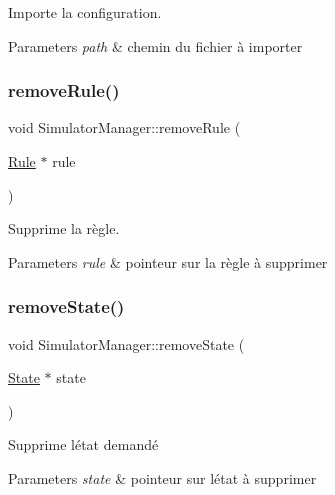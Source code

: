 Importe la configuration. 


\begin{DoxyParams}{Parameters}
{\em path} & chemin du fichier à importer \\
\hline
\end{DoxyParams}
\mbox{\label{class_simulator_manager_af1d1744014e8898b4e0a359c4a68e29e}} 
\subsubsection{\texorpdfstring{remove\+Rule()}{removeRule()}}
{\footnotesize\ttfamily void Simulator\+Manager\+::remove\+Rule (\begin{DoxyParamCaption}\item[{\mbox{\hyperlink{class_rule}{Rule}} $\ast$}]{rule }\end{DoxyParamCaption})}



Supprime la règle. 


\begin{DoxyParams}{Parameters}
{\em rule} & pointeur sur la règle à supprimer \\
\hline
\end{DoxyParams}
\mbox{\label{class_simulator_manager_abe61b011be2d4d43c956cbc2d0cca186}} 
\subsubsection{\texorpdfstring{remove\+State()}{removeState()}}
{\footnotesize\ttfamily void Simulator\+Manager\+::remove\+State (\begin{DoxyParamCaption}\item[{\mbox{\hyperlink{class_state}{State}} $\ast$}]{state }\end{DoxyParamCaption})}



Supprime l\textquotesingle{}état demandé 


\begin{DoxyParams}{Parameters}
{\em state} & pointeur sur l\textquotesingle{}état à supprimer \\
\hline
\end{DoxyParams}
\mbox{\label{class_simulator_manager_af21cbe0dd12b91b567a0169d39459694}} 

